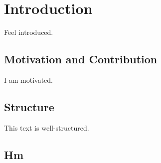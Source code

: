 \chapter{Introduction}

	Feel introduced.
	
	\section{Motivation and Contribution}
	
		I am motivated.
	
	\section{Structure}
	
		This text is well-structured.
		
	\section{Hm}
	
		\blindtext
